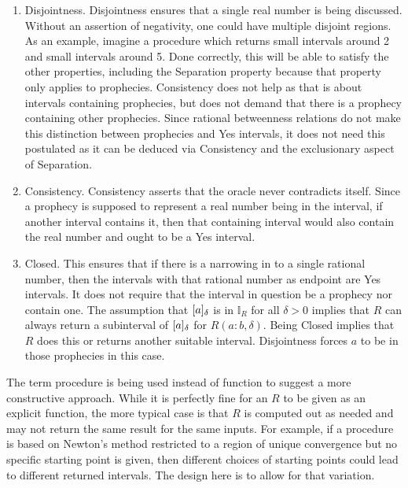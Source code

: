 \documentclass[12pt]{article}
\begin{document}
\begin{enumerate}
    \item Disjointness. Disjointness ensures that a single real number is being discussed. Without an assertion of negativity, one could have multiple disjoint regions.  As an example, imagine a procedure which returns small intervals around 2 and small intervals around 5. Done correctly, this will be able to satisfy the other properties, including the Separation property because that property only applies to prophecies. Consistency does not help as that is about intervals containing prophecies, but does not demand that there is a prophecy containing other prophecies.  Since rational betweenness relations do not make this distinction between prophecies and Yes intervals, it does not need this postulated as it can be deduced via Consistency and the exclusionary aspect of Separation. 
    
    \item Consistency. Consistency asserts that the oracle never contradicts itself. Since a prophecy is supposed to represent a real number being in the interval, if another interval contains it, then that containing interval would also contain the real number and ought to be a Yes interval. 
    
    \item Closed. This ensures that if there is a narrowing in to a single rational number, then the intervals with that rational number as endpoint are Yes intervals. It does not require that the interval in question be a prophecy nor contain one. The assumption that $[a]_{\delta}$ is in $\mathbb{I}_R$ for all $\delta >0$ implies that $R$ can always return a subinterval of $[a]_{\delta}$ for $R(a:b, \delta)$. Being Closed implies that $R$ does this or returns another suitable interval. Disjointness forces $a$ to be in those prophecies in this case. 

\end{enumerate}

The term procedure is being used instead of function to suggest a more constructive approach. While it is perfectly fine for an $R$ to be given as an explicit function, the more typical case is that $R$ is computed out as needed and may not return the same result for the same inputs. For example, if a procedure is based on Newton's method restricted to a region of unique convergence but no specific starting point is given, then different choices of starting points could lead to different returned intervals. The design here is to allow for that variation. 
\end{document}
